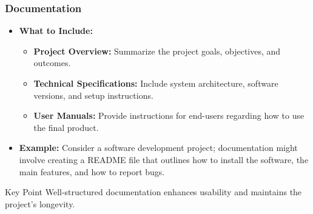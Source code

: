 \documentclass{beamer}
\begin{document}
\begin{frame}[fragile]
    \frametitle{Documentation}
    \begin{itemize}
        \item \textbf{What to Include:}
        \begin{itemize}
            \item \textbf{Project Overview:} Summarize the project goals, objectives, and outcomes.
            \item \textbf{Technical Specifications:} Include system architecture, software versions, and setup instructions.
            \item \textbf{User Manuals:} Provide instructions for end-users regarding how to use the final product.
        \end{itemize}
        \item \textbf{Example:} 
            Consider a software development project; documentation might involve creating a README file that 
            outlines how to install the software, the main features, and how to report bugs.
    \end{itemize}
    \begin{block}{Key Point}
        Well-structured documentation enhances usability and maintains the project's longevity.
    \end{block}
\end{frame}
\end{document}
